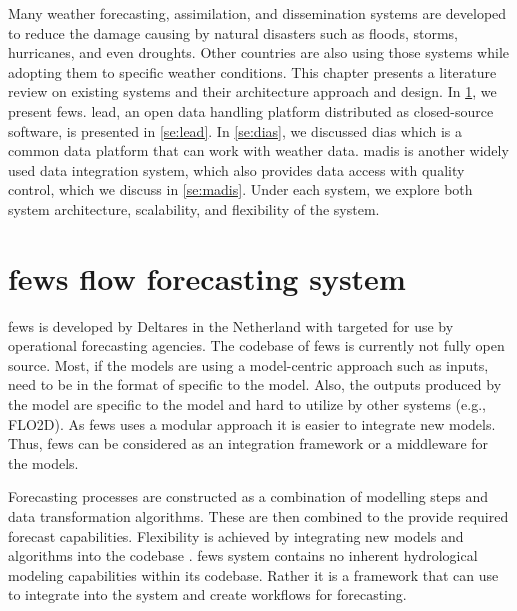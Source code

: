 Many weather forecasting, assimilation, and dissemination systems are developed to reduce the damage causing by natural disasters such as floods, storms, hurricanes, and even droughts. %
Other countries are also using those systems while adopting them %
to specific weather conditions.%
This chapter presents a literature review on existing systems and their architecture approach and design. In \cref{se:fews}, we present \acrshort{fews}. \acrfull{lead}, an open data handling platform distributed as closed-source software, is presented in \cref{se:lead}. %
In \cref{se:dias}, we discussed \acrfull{dias} which is a common data platform that can work with weather data. \acrfull{madis} is another widely used data integration system, which also provides data access with quality control, which we discuss in \cref{se:madis}.
Under each system, we explore both system architecture, scalability, and flexibility of the system.



\section{\acrshort{fews} flow forecasting system}
\label{se:fews}

\acrshort{fews} \cite{Werner2013TheSystem} is developed by Deltares in the Netherland with targeted for use by operational forecasting agencies. The codebase of \acrshort{fews} is currently not fully open source.
Most, if the models are using a model-centric approach such as inputs, need to be in the format of specific to the model. Also, the outputs produced by the model are specific to the model and hard to utilize by other systems (e.g., FLO2D). As \acrshort{fews} uses a modular approach it is easier to integrate new models. 
Thus, \acrshort{fews} can be considered as an integration framework or a middleware for the models.

Forecasting processes are constructed as a combination of modelling steps and data transformation algorithms. These are then combined to the provide required forecast capabilities. Flexibility is achieved by integrating new models and algorithms into the codebase \cite{Werner2013TheSystem}. \acrshort{fews} system contains no inherent hydrological modeling capabilities within its codebase. Rather it is a framework that can use to integrate into the system and create workflows for forecasting.

